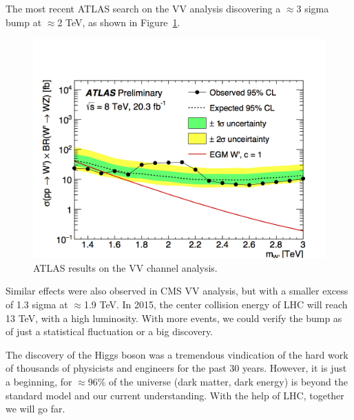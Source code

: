 The most recent ATLAS search on the VV analysis discovering a $\approx$3 sigma 
bump at $\approx$2 TeV, as shown in Figure~\ref{fig:atlasvv}. 
\begin{figure}[!htbp]
\centering
\includegraphics[width=.9\textwidth]{figures/atlas.png}
\caption{ATLAS results on the VV channel analysis.}
\label{fig:atlasvv}
\end{figure}
Similar effects were also observed in CMS VV analysis, but with a smaller excess of 1.3 sigma at
$\approx$1.9 TeV.  In 2015, the center collision energy of LHC will reach 13 TeV, with a high 
luminosity. With more events, we could verify the bump as of just a statistical fluctuation or a 
big discovery. 
 
The discovery of the Higgs boson was a tremendous vindication of the hard work of thousands of physicists and engineers for the past 30 years. However, it is just a beginning, for $\approx$96\% of 
the universe (dark matter, dark energy) is beyond the standard model and our current understanding. 
With the help of LHC, together we will go far. 




 

